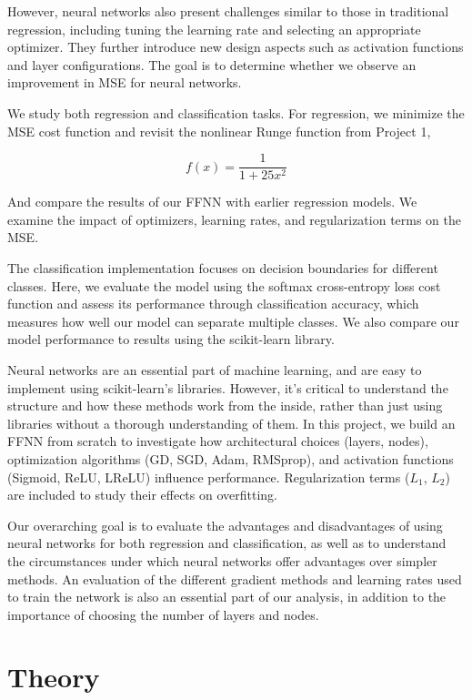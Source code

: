 \documentclass[amssymb,twocolumn,aps,floatfix]{revtex4-2}
\begin{document}
However, neural networks also present challenges similar to those in traditional regression, including tuning the learning rate and selecting an appropriate optimizer. They further introduce new design aspects such as activation functions and layer configurations. The goal is to determine whether we observe an improvement in MSE for neural networks. 

We study both regression and classification tasks. For regression, we minimize the MSE cost function and revisit the nonlinear Runge function from Project 1,

\begin{equation}
    f(x) = \frac{1}{1 + 25x^2}
    \label{eq:runge}
\end{equation}

And compare the results of our FFNN with earlier regression models. We examine the impact of optimizers, learning rates, and regularization terms on the MSE.

The classification implementation focuses on decision boundaries for different classes. Here, we evaluate the model using the softmax cross-entropy loss cost function and assess its performance through classification accuracy, which measures how well our model can separate multiple classes. We also compare our model performance to results using the scikit-learn library. 

Neural networks are an essential part of machine learning, and are easy to implement using scikit-learn's libraries. However, it's critical to understand the structure and how these methods work from the inside, rather than just using libraries without a thorough understanding of them.  In this project, we build an FFNN from scratch to investigate how architectural choices (layers, nodes), optimization algorithms (GD, SGD, Adam, RMSprop), and activation functions (Sigmoid, ReLU, LReLU) influence performance. Regularization terms ($L_1$, $L_2$) are included to study their effects on overfitting. 

Our overarching goal is to evaluate the advantages and disadvantages of using neural networks for both regression and classification, as well as to understand the circumstances under which neural networks offer advantages over simpler methods. An evaluation of the different gradient methods and learning rates used to train the network is also an essential part of our analysis, in addition to the importance of choosing the number of layers and nodes. 

\section{Theory}
\label{section:theory}
\end{document}

